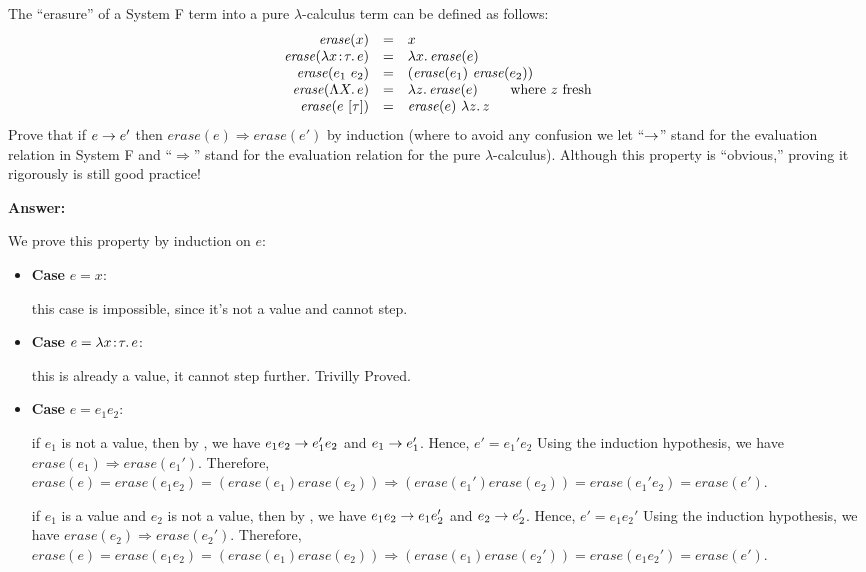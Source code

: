 \documentclass[10pt]{article}
\begin{document}
\begin{exercise}
  The ``erasure'' of a System F term into a pure $\lambda$-calculus
  term can be defined as follows:
%
\[
\begin{array}{rcl}
\mathit{erase}(x) & = & x\\
\mathit{erase}(\lambda x \!:\! \tau.\,e) & = & \lambda x.\,\mathit{erase}(e)\\
\mathit{erase}(e_1~e_2) & = & (\mathit{erase}(e_1)~ \mathit{erase}(e_2))\\
\mathit{erase}(\Lambda X.\,e) & = & \lambda z.\,\mathit{erase}(e)~\qquad \text{where}~z~\text{fresh}\\
\mathit{erase}(e~[\tau]) & =& \mathit{erase}(e)~\lambda z.\,z
\end{array}
\]
%
Prove that if $e \rightarrow e'$ then
$\mathit{erase}(e) \Rightarrow \mathit{erase}(e')$ by induction (where
to avoid any confusion we let ``$\rightarrow$'' stand for the evaluation
relation in System F and ``$\Rightarrow$'' stand for the evaluation
relation for the pure $\lambda$-calculus). Although this property is
``obvious,'' proving it rigorously is still good practice!

\noindent \textbf{Answer:}

We prove this property by induction on $e$:
\begin{itemize}
	\item \textbf{Case} $e = x$: 
	
	this case is impossible, since it's not a value and cannot step.
	\item \textbf{Case} $e = \lambda x\!:\!\tau.\,e$: 
	
	this is already a value, it cannot step further. Trivilly Proved.
	\item \textbf{Case} $e = e_1e_2$: 
	
	if $e_1$ is not a value, then by , we have $e_1e_2 \rightarrow e_1'e_2$ and 
	$e_1 \rightarrow e_1'$. Hence, $e' = e_1'e_2$ Using the induction hypothesis, 
	we have $erase(e_1) \Rightarrow erase(e_1')$.
	Therefore, $erase(e) = erase(e_1e_2) = (erase(e_1)erase(e_2)) \Rightarrow (erase(e_1')erase(e_2))
	= erase(e_1'e_2) = erase(e')$.
	
	if $e_1$ is a value and $e_2$ is not a value, then by , we have $e_1e_2 \rightarrow e_1e_2'$ and 
	$e_2 \rightarrow e_2'$. Hence, $e' = e_1e_2'$ Using the induction hypothesis, 
	we have $erase(e_2) \Rightarrow erase(e_2')$.
	Therefore, $erase(e) = erase(e_1e_2) = (erase(e_1)erase(e_2)) \Rightarrow (erase(e_1)erase(e_2'))
	= erase(e_1e_2') = erase(e')$.
	

\end{itemize}
\end{exercise}
\end{document}
